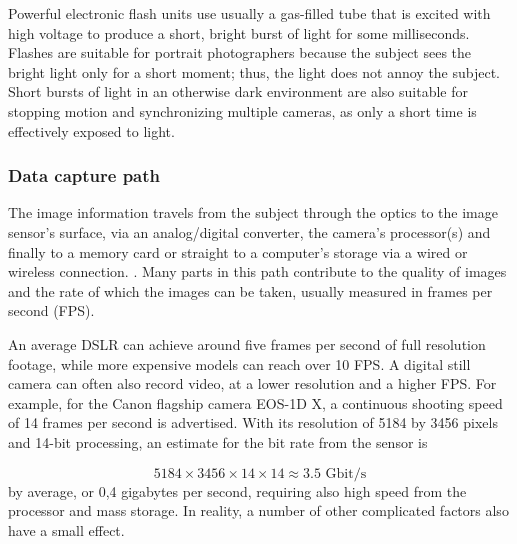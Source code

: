 Powerful electronic flash units use usually a gas-filled tube that is excited with high voltage to produce a short, bright burst of light for some milliseconds.
Flashes are suitable for portrait photographers because the subject sees the bright light only for a short moment; thus, the light does not annoy the subject.
Short bursts of light in an otherwise dark environment are also suitable for stopping motion and synchronizing multiple cameras, as only a short time is effectively exposed to light.
\cite{langford2000basic}





\subsubsection{Data capture path} %

The image information travels from the subject through the optics to the image sensor's surface, via an analog/digital converter, the camera's processor(s) and finally to a memory card or straight to a computer's storage via a wired or wireless connection.
\cite{szeliski10vision}.
Many parts in this path contribute to the quality of images and the rate of which the images can be taken, usually measured in frames per second (FPS).


An average DSLR can achieve around five frames per second of full resolution footage, while more expensive models can reach over 10 FPS.
A digital still camera can often also record video, at a lower resolution and a higher FPS.
For example, for the Canon flagship camera EOS-1D X, a continuous shooting speed of 14 frames per second is advertised. \cite{eos1dx}
With its resolution of 5184 by 3456 pixels and 14-bit processing, an estimate for the bit rate from the sensor is

\begin{equation} \label{eq:eos1dspeed}
5184 \times 3456 \times 14 \times 14 \approx 3.5\text{ Gbit/s}
\end{equation}
by average, or 0,4 gigabytes per second, requiring also high speed from the processor and mass storage.
In reality, a number of other complicated factors also have a small effect.

